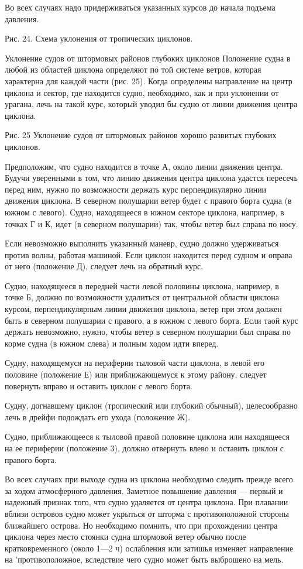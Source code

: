 Во всех случаях надо придерживаться указанных курсов до начала подъема давления.


Рис. 24. Схема уклонения от тропических циклонов.

Уклонение судов от штормовых районов глубоких циклонов
Положение судна в любой из областей циклона определяют по той системе ветров, которая характерна для каждой части (рис. 25). Когда определены направление на центр циклона и сектор, где находится судно, необходимо, как и при уклонении от урагана, лечь на такой курс, который уводил бы судно от линии движения центра циклона.


Рис. 25 Уклонение судов от штормовых районов хорошо развитых глубоких циклонов.

Предположим, что судно находится в точке А, около линии движения центра. Будучи уверенными в том, что линию движения центра циклона удастся пересечь перед ним, нужно по возможности держать курс перпендикулярно линии движения циклона. В северном полушарии ветер будет с правого борта судна (в южном с левого). Судно, находящееся в южном секторе циклона, например, в точках Г и К, идет (в северном полушарии) так, чтобы ветер был справа по носу.

Если невозможно выполнить указанный маневр, судно должно удерживаться против волны, работая машиной. Если циклон находится перед судном и оправа от него (положение Д), следует лечь на обратный курс.

Судно, находящееся в передней части левой половины циклона, например, в точке Б, должно по возможности удалиться от центральной области циклона курсом, перпендикулярным линии движения циклона, ветер при этом должен быть в северном полушарии с правого, а в южном с левого борта. Если таой курс держать невозможно, нужно, чтобы ветер в северном полушарии был справа по корме судна (в южном слева) и полным ходом идти вперед.

Судну, находящемуся на периферии тыловой части циклона, в левой его половине (положение Е) или приближающемуся к этому району, следует повернуть вправо и оставить циклон с левого борта.

Судну, догнавшему циклон (тропический или глубокий обычный), целесообразно лечь в дрейфи подождать его ухода (положение Ж).

Судно, приближающееся к тыловой правой половине циклона или находящееся на ее периферии (положение 3), должно отвернуть влево и оставить циклон с правого борта.

Во всех случаях при выходе судна из циклона необходимо следить прежде всего за ходом атмосферного давления. Заметное повышение давления — первый и надежный признак того, что судно удаляется от центра циклона. При плавании вблизи островов судно может укрыться от шторма с противоположной стороны ближайшего острова. Но необходимо помнить, что при прохождении центра циклона через место стоянки судна штормовой ветер обычно после кратковременного (около 1—2 ч) ослабления или затишья изменяет направление на 'противоположное, вследствие чего судно может быть выброшено на мель.

